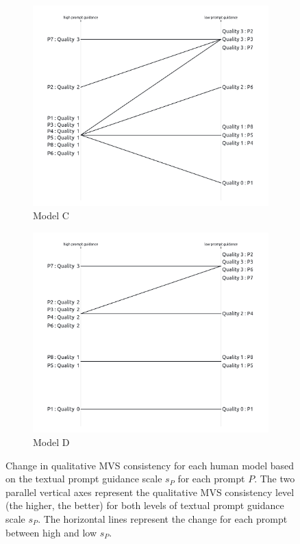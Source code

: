 \begin{figure}[h]
	\begin{subfigure}{0.24\linewidth}
		\includegraphics[width=\textwidth]{Figures/results/qualitative_C.png}
		\caption{Model C}
	\end{subfigure}
	\begin{subfigure}{0.24\linewidth}
		\includegraphics[width=\textwidth]{Figures/results/qualitative_D.png}
		\caption{Model D}
	\end{subfigure}
	\caption{Change in qualitative MVS consistency for each human model based on the textual prompt guidance scale $s_P$ for each prompt $P$. The two parallel vertical axes represent the qualitative MVS consistency level (the higher, the better) for both levels of textual prompt guidance scale $s_P$. The horizontal lines represent the change for each prompt between high and low $s_P$.}
	\label{fig:MVS_consistency_change}

\end{figure}

